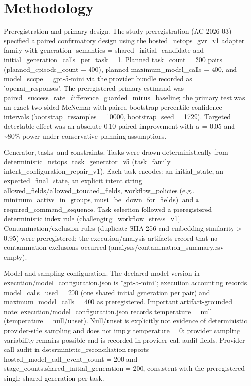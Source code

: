 \documentclass[conference]{IEEEtran}
\begin{document}
\section{Methodology}
Preregistration and primary design. The study preregistration (AC-2026-03) specified a paired confirmatory design using the hosted\_netops\_gvr\_v1 adapter family with generation\_semantics = shared\_initial\_candidate and initial\_generation\_calls\_per\_task = 1. Planned task\_count = 200 pairs (planned\_episode\_count = 400), planned maximum\_model\_calls = 400, and model\_scope = gpt-5-mini via the provider bundle recorded as 'openai\_responses'. The preregistered primary estimand was paired\_success\_rate\_difference\_guarded\_minus\_baseline; the primary test was an exact two-sided McNemar with paired bootstrap percentile confidence intervals (bootstrap\_resamples = 10000, bootstrap\_seed = 1729). Targeted detectable effect was an absolute 0.10 paired improvement with \ensuremath{\alpha} = 0.05 and \textasciitilde{}80\% power under conservative planning assumptions.

Generator, tasks, and constraints. Tasks were drawn deterministically from deterministic\_netops\_task\_generator\_v5 (task\_family = intent\_configuration\_repair\_v1). Each task encodes: an initial\_state, an expected\_final\_state, an explicit intent string, allowed\_fields/allowed\_touched\_fields, workflow\_policies (e.g., minimum\_active\_in\_groups, must\_be\_down\_for\_fields), and a required\_command\_sequence. Task selection followed a preregistered deterministic index rule (challenging\_workflow\_stress\_v1). Contamination/exclusion rules (duplicate SHA-256 and embedding-similarity > 0.95) were preregistered; the execution/analysis artifacts record that no contamination exclusions occurred (analysis/contamination\_summary.csv empty).

Model and sampling configuration. The declared model version in execution/model\_configuration.json is "gpt-5-mini"; execution accounting records model\_calls\_used = 200 (one shared initial generation per pair) and maximum\_model\_calls = 400 as preregistered. Important artifact-grounded note: execution/model\_configuration.json records temperature = null (temperature = null/unset). Null/unset is explicitly not evidence of deterministic provider-side sampling and does not imply temperature = 0; provider sampling variability remains possible and is recorded in provider-call audit fields. Provider-call audit in deterministic\_reconciliation reports hosted\_model\_call\_event\_count = 200 and stage\_counts.shared\_initial\_generation = 200, consistent with the preregistered single shared generation per task.
\end{document}
